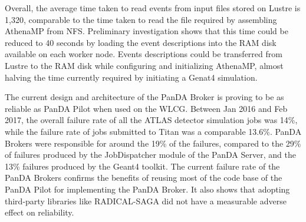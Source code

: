 
Overall, the average time taken to read events from input files stored on Lustre is 1,320, comparable to the time taken to read the file required by assembling AthenaMP from NFS. Preliminary investigation shows that this time could be reduced to 40 seconds by loading the event descriptions into the RAM disk available on each worker node. Events descriptions could be transferred from Lustre to the RAM disk while configuring and initializing AthenaMP, almost halving the time currently required by initiating a Genat4 simulation.

The current design and architecture of the PanDA Broker is proving to be as
reliable as PanDA Pilot when used on the WLCG. Between Jan 2016 and Feb 2017,
the overall failure rate of all the ATLAS detector simulation jobs was 14\%,
while the failure rate of jobs submitted to Titan was a comparable 13.6\%. PanDA
Brokers were responsible for around the 19\% of the failures, compared to the
29\% of failures produced by the JobDispatcher module of the PanDA Server, and
the 13\% failures produced by the Geant4 toolkit. The current failure rate of
the PanDA Brokers confirms the benefits of reusing most of the code base of the
PanDA Pilot for implementing the PanDA Broker. It also shows that adopting
third-party libraries like RADICAL-SAGA did not have a measurable adverse effect
on reliability.

